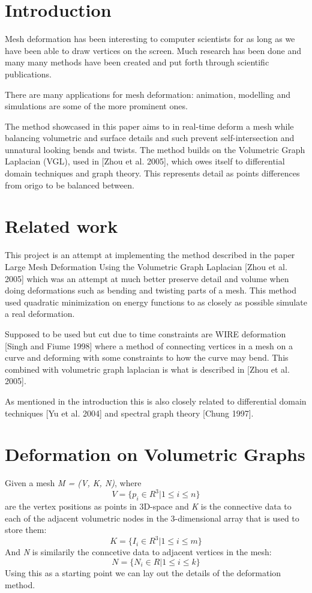 \documentclass[10pt]{article}
\begin{document}
\begin{multicols}{2}
\section{Introduction}
Mesh deformation has been interesting to computer scientists for as long as we have been able to draw vertices on the screen. Much research has been done and many many methods have been created and put forth through scientific publications. 

There are many applications for mesh deformation: animation, modelling and simulations are some of the more prominent ones.

The method showcased in this paper aims to in real-time deform a mesh while balancing volumetric and surface details and such prevent self-intersection and unnatural looking bends and twists. 
The method builds on the Volumetric Graph Laplacian (VGL), used in [Zhou et al. 2005], which owes itself to differential domain techniques and graph theory. This represents detail as points differences from origo to be balanced between.
\section{Related work}

This project is an attempt at implementing the method described in the paper Large Mesh Deformation Using the Volumetric Graph Laplacian [Zhou et al. 2005] which was an attempt at much better preserve detail and volume when doing deformations such as bending and twisting parts of a mesh. This method used quadratic minimization on energy functions to as closely as possible simulate a real deformation.

Supposed to be used but cut due to time constraints are WIRE deformation [Singh and Fiume 1998] where a method of connecting vertices in a mesh on a curve and deforming with some constraints to how the curve may bend. This combined with volumetric graph laplacian is what is described in [Zhou et al. 2005].

As mentioned in the introduction this is also closely related to differential domain techniques [Yu et al. 2004] and spectral graph theory [Chung 1997].

\section{Deformation on Volumetric Graphs}

Given a mesh \textit{M = (V, K, N)}, where \textit{ \[ V = \{ p_i \in R^3|1\leq i \leq n \} \] } are the vertex positions as points in 3D-space and \textit{K} is the connective data to each of the adjacent volumetric nodes in the 3-dimensional array that is used to store them: \textit{ \[ K = \{ I_i \in R^3|1\leq i \leq m \} \] } And \textit{N} is similarily the conncetive data to adjacent vertices in the mesh: \textit{ \[ N = \{ N_i \in R|1\leq i \leq k \} \] } Using this as a starting point we can lay out the details of the deformation method.

\end{multicols}
\end{document}
